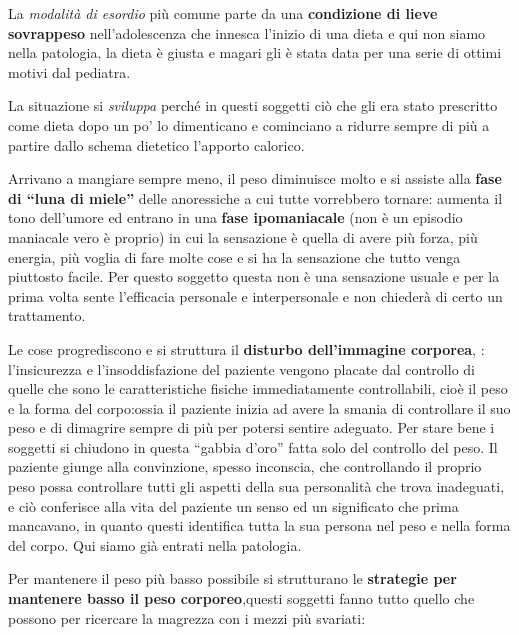 \documentclass[]{article}
\begin{document}
La \emph{\emph{modalità di esordio}} più comune parte da una
\textbf{condizione di lieve sovrappeso} nell'adolescenza che innesca
l'inizio di una dieta e qui non siamo nella patologia, la dieta è giusta
e magari gli è stata data per una serie di ottimi motivi dal pediatra.

La situazione si \emph{\emph{sviluppa}} perché in questi soggetti ciò
che gli era stato prescritto come dieta dopo un po' lo dimenticano e
cominciano a ridurre sempre di più a partire dallo schema dietetico
l'apporto calorico.

Arrivano a mangiare sempre meno, il peso diminuisce molto e si assiste
alla \textbf{fase di ``luna di miele''} delle anoressiche a cui tutte
vorrebbero tornare: aumenta il tono dell'umore ed entrano in una
\textbf{fase ipomaniacale} (non è un episodio maniacale vero è proprio)
in cui la sensazione è quella di avere più forza, più energia, più
voglia di fare molte cose e si ha la sensazione che tutto venga
piuttosto facile. Per questo soggetto questa non è una sensazione usuale
e per la prima volta sente l'efficacia personale e interpersonale e non
chiederà di certo un trattamento.

Le cose progrediscono e si struttura il \textbf{disturbo dell'immagine
corporea}, : l'insicurezza e l'insoddisfazione del paziente vengono
placate dal controllo di quelle che sono le caratteristiche fisiche
immediatamente controllabili, cioè il peso e la forma del corpo:ossia il
paziente inizia ad avere la smania di controllare il suo peso e di
dimagrire sempre di più per potersi sentire adeguato. Per stare bene i
soggetti si chiudono in questa ``gabbia d'oro'' fatta solo del controllo
del peso. Il paziente giunge alla convinzione, spesso inconscia, che
controllando il proprio peso possa controllare tutti gli aspetti della
sua personalità che trova inadeguati, e ciò conferisce alla vita del
paziente un senso ed un significato che prima mancavano, in quanto
questi identifica tutta la sua persona nel peso e nella forma del corpo.
Qui siamo già entrati nella patologia.

Per mantenere il peso più basso possibile si strutturano le
\textbf{strategie per mantenere basso il peso corporeo},questi soggetti
fanno tutto quello che possono per ricercare la magrezza con i mezzi più
svariati:
\end{document}
